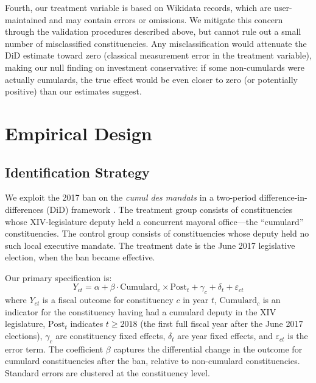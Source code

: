 \documentclass[12pt]{article}
\begin{document}
Fourth, our treatment variable is based on Wikidata records, which are user-maintained and may contain errors or omissions. We mitigate this concern through the validation procedures described above, but cannot rule out a small number of misclassified constituencies. Any misclassification would attenuate the DiD estimate toward zero (classical measurement error in the treatment variable), making our null finding on investment conservative: if some non-cumulards were actually cumulards, the true effect would be even closer to zero (or potentially positive) than our estimates suggest.


\section{Empirical Design}\label{sec:design}

\subsection{Identification Strategy}

We exploit the 2017 ban on the \textit{cumul des mandats} in a two-period difference-in-differences (DiD) framework \citep{bertrand2004much}. The treatment group consists of constituencies whose XIV-legislature deputy held a concurrent mayoral office---the ``cumulard'' constituencies. The control group consists of constituencies whose deputy held no such local executive mandate. The treatment date is the June 2017 legislative election, when the ban became effective.

Our primary specification is:
\begin{equation}\label{eq:did}
Y_{ct} = \alpha + \beta \cdot \text{Cumulard}_c \times \text{Post}_t + \gamma_c + \delta_t + \varepsilon_{ct}
\end{equation}
where $Y_{ct}$ is a fiscal outcome for constituency $c$ in year $t$, $\text{Cumulard}_c$ is an indicator for the constituency having had a cumulard deputy in the XIV legislature, $\text{Post}_t$ indicates $t \geq 2018$ (the first full fiscal year after the June 2017 elections), $\gamma_c$ are constituency fixed effects, $\delta_t$ are year fixed effects, and $\varepsilon_{ct}$ is the error term. The coefficient $\beta$ captures the differential change in the outcome for cumulard constituencies after the ban, relative to non-cumulard constituencies. Standard errors are clustered at the constituency level.
\end{document}
